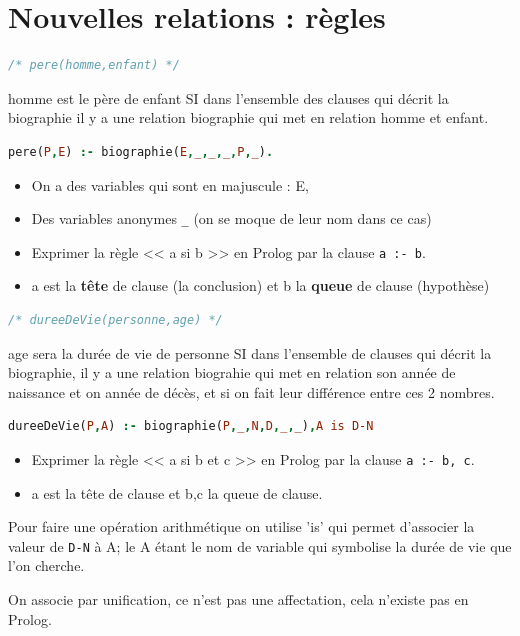 \documentclass[12pt,a4paper,openany]{book}
\begin{document}
	\section{Nouvelles relations : règles}
		\begin{lstlisting}[language=Prolog]
/* pere(homme,enfant) */
		\end{lstlisting}
	homme est le père de enfant SI dans l'ensemble des clauses qui décrit la biographie il y a une relation biographie qui met en relation homme et
	enfant.
		\begin{lstlisting}[language=Prolog]
pere(P,E) :- biographie(E,_,_,_,P,_).
		\end{lstlisting}
		\begin{itemize}
			\item On a des variables qui sont en majuscule : E, 
			\item Des variables anonymes \texttt{\_} (on se moque de leur nom dans ce cas)
			\item Exprimer la règle << a si b >> en Prolog par la clause \texttt{a :- b}.
			\item a est la \textbf{tête} de clause (la conclusion) et b la \textbf{queue} de clause (hypothèse)
		\end{itemize}
		\begin{lstlisting}[language=Prolog]
/* dureeDeVie(personne,age) */
		\end{lstlisting}
		age sera la durée de vie de personne SI dans l'ensemble de clauses qui décrit la biographie, il y a une relation biograhie qui met en relation
		son année de naissance et on année de décès, et si on fait leur différence entre ces 2 nombres.
		\begin{lstlisting}[language=Prolog]
dureeDeVie(P,A) :- biographie(P,_,N,D,_,_),A is D-N			
		\end{lstlisting}
		\begin{itemize}
			\item Exprimer la règle << a si b et c >> en Prolog par la clause \texttt{a :- b, c}.
			\item a est la tête de clause et b,c la queue de clause.
		\end{itemize}
		Pour faire une opération arithmétique on utilise 'is' qui permet d'associer la valeur de \texttt{D-N} à A; le A étant le nom de variable qui
		symbolise la durée de vie que l'on cherche.

		\begin{attention}
			On associe par unification, ce n'est pas une affectation, cela n'existe pas en Prolog.
		\end{attention}
\end{document}

